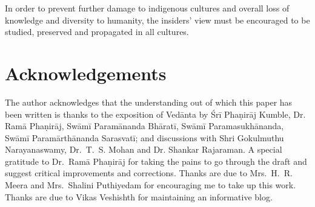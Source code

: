 In order to prevent further damage to indigenous cultures and overall loss of knowledge and diversity to humanity, the insiders' view must be encouraged to be studied, preserved and propagated in all cultures. 


\section*{Acknowledgements}

The author acknowledges that the understanding out of which this paper has been written is thanks to the exposition of Vedānta by Śrī Phaṇirāj Kumble, Dr. Ramā Phaṇirāj, Swāmī Paramānanda Bhāratī, Swāmī Paramasukhānanda, Swāmī Paramārthānanda Sarasvatī; and discussions with Shri Gokulmuthu Narayanaswamy, Dr.~T.~S. Mohan and Dr. Shankar Rajaraman. A special gratitude to Dr.~Ramā Phaṇirāj for taking the pains to go through the draft and suggest critical improvements and corrections. Thanks are due to Mrs.~H.~R. Meera and Mrs.~Shalini Puthiyedam for encouraging me to take up this work. Thanks are due to Vikas Veshishth for maintaining an informative blog.

